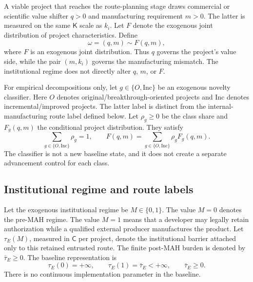 A viable project that reaches the route-planning stage draws commercial or
scientific value shifter \(q>0\) and manufacturing requirement \(m>0\).  The
latter is measured on the same \(\mathsf K\) scale as \(k_i\). Let
\(F\) denote the exogenous joint distribution of project characteristics. Define
\begin{equation}
  \omega=(q,m)\sim F(q,m),
  \label{eq:p01-project-draw}
\end{equation}
where \(F\) is an exogenous joint distribution.  Thus \(q\) governs the
project's value side, while the pair \((m,k_i)\) governs the manufacturing
mismatch.  The institutional regime does not directly alter \(q\), \(m\), or
\(F\).

For empirical decompositions only, let
\(g\in\{O,\mathrm{Inc}\}\) be an exogenous novelty classifier.  Here \(O\) denotes original/breakthrough-oriented projects and
\(\mathrm{Inc}\) denotes incremental/improved projects. The latter label
is distinct from the internal-manufacturing route label defined below.  Let
\(\rho_g\geq0\) be the class share and \(F_g(q,m)\) the conditional project
distribution.  They satisfy
\begin{equation}
  \sum_{g\in\{O,\mathrm{Inc}\}}\rho_g=1,
  \qquad
  F(q,m)=
  \sum_{g\in\{O,\mathrm{Inc}\}}\rho_gF_g(q,m).
  \label{eq:p01-class-mixture}
\end{equation}
The classifier is not a new baseline state, and it does not create a separate
advancement control for each class.

\subsection{Institutional regime and route labels}
\label{subsec:p01-institution-routes}

Let the exogenous institutional regime be \(M\in\{0,1\}\).  The value \(M=0\)
denotes the pre-MAH regime.  The value \(M=1\) means that a developer may
legally retain authorization while a qualified external producer manufactures
the product.  Let \(\tau_E(M)\), measured in \(\mathsf C\) per project, denote
the institutional barrier attached only to this retained entrusted route.  The
finite post-MAH burden is denoted by \(\bar\tau_E\geq0\). The baseline
representation is
\begin{equation}
  \tau_E(0)=+\infty,
  \qquad
  \tau_E(1)=\bar\tau_E<+\infty,
  \qquad
  \bar\tau_E\geq0.
  \label{eq:p01-institutional-wedge}
\end{equation}
There is no continuous implementation parameter in the baseline.

